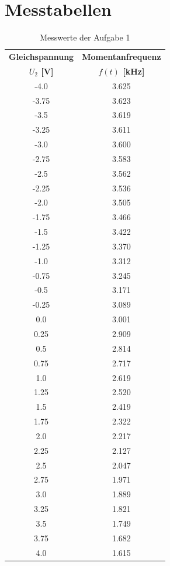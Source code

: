 \documentclass[12pt]{scrartcl}
\begin{document}
\section{Messtabellen}
\label{Ah:Messtabellen}
 \begin{table}[!h] 
     \centering
     \begin{tabular}{|c|c|} 
 \hline\textbf{Gleichspannung} & \textbf{Momentanfrequenz}  \\
 \textbf{$U_2$ [V]} & \textbf{$f(t)$ [kHz] } \\ \hline
             -4.0 & 3.625  \\ \hline 
             -3.75 & 3.623 \\ \hline
             -3.5 & 3.619 \\ \hline
             -3.25 & 3.611 \\ \hline
             -3.0 & 3.600  \\ \hline
             -2.75 & 3.583 \\ \hline
             -2.5 & 3.562  \\ \hline
             -2.25 & 3.536 \\ \hline
             -2.0 & 3.505 \\ \hline
             -1.75 & 3.466 \\ \hline
             -1.5  & 3.422  \\ \hline
             -1.25 & 3.370 \\ \hline
             -1.0  & 3.312  \\ \hline
             -0.75 & 3.245 \\ \hline
             -0.5  & 3.171  \\ \hline
             -0.25 & 3.089 \\ \hline
             0.0  & 3.001  \\ \hline
             0.25  & 2.909  \\ \hline
             0.5  & 2.814  \\ \hline
             0.75  & 2.717  \\ \hline
             1.0  & 2.619  \\ \hline
             1.25  & 2.520  \\ \hline
             1.5  & 2.419  \\ \hline
             1.75  & 2.322  \\ \hline
             2.0  & 2.217 \\ \hline
             2.25  & 2.127  \\ \hline
             2.5  & 2.047 \\ \hline
             2.75  & 1.971  \\ \hline
             3.0  & 1.889 \\ \hline
             3.25  & 1.821  \\ \hline
             3.5  & 1.749 \\ \hline
             3.75  & 1.682  \\ \hline
             4.0  & 1.615 \\ \hline
     \end{tabular}
 \caption{Messwerte der Aufgabe 1}\label{tab:Aufgabe1}
 \end{table}
\end{document}
